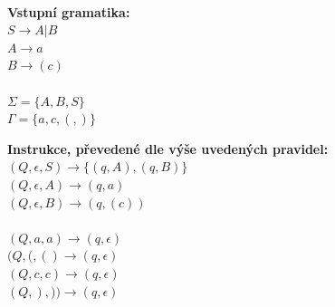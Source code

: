\noindent\\\begin{minipage}[t]{0.35\textwidth}
\textbf{Vstupní gramatika:}\\
$S \rightarrow A | B$\\
$A \rightarrow a$\\
$B \rightarrow (c)$\\\smallskip\\
$\Sigma = \{A, B, S\}$\\
$\Gamma = \{a, c, (, )\}$
\end{minipage}
\begin{minipage}[t]{0.65\textwidth}
\textbf{Instrukce, převedené dle výše uvedených pravidel:}\\
$(Q, \epsilon, S) \rightarrow \{(q, A), (q, B)\}$\\
$(Q, \epsilon, A) \rightarrow (q, a)$\\
$(Q, \epsilon, B) \rightarrow (q, (c))$\\\smallskip\\
$(Q, a, a) \rightarrow (q, \epsilon)$\\
$(Q, (, () \rightarrow (q, \epsilon)$\\
$(Q, c, c) \rightarrow (q, \epsilon)$\\
$(Q, ), )) \rightarrow (q, \epsilon)$\\
\end{minipage}